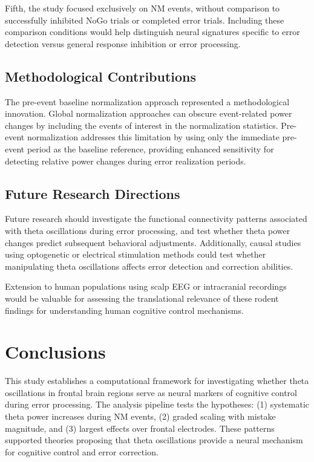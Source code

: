 \documentclass[11pt]{article}
\begin{document}
Fifth, the study focused exclusively on NM events, without comparison to successfully inhibited NoGo trials or completed error trials. Including these comparison conditions would help distinguish neural signatures specific to error detection versus general response inhibition or error processing.

\subsection{Methodological Contributions}

The pre-event baseline normalization approach represented a methodological innovation. Global normalization approaches can obscure event-related power changes by including the events of interest in the normalization statistics. Pre-event normalization addresses this limitation by using only the immediate pre-event period as the baseline reference, providing enhanced sensitivity for detecting relative power changes during error realization periods.

\subsection{Future Research Directions}

Future research should investigate the functional connectivity patterns associated with theta oscillations during error processing, and test whether theta power changes predict subsequent behavioral adjustments. Additionally, causal studies using optogenetic or electrical stimulation methods could test whether manipulating theta oscillations affects error detection and correction abilities.

Extension to human populations using scalp EEG or intracranial recordings would be valuable for assessing the translational relevance of these rodent findings for understanding human cognitive control mechanisms.

\section{Conclusions}

This study establishes a computational framework for investigating whether theta oscillations in frontal brain regions serve as neural markers of cognitive control during error processing. The analysis pipeline tests the hypotheses: (1) systematic theta power increases during NM events, (2) graded scaling with mistake magnitude, and (3) largest effects over frontal electrodes. These patterns supported theories proposing that theta oscillations provide a neural mechanism for cognitive control and error correction.
\end{document}
